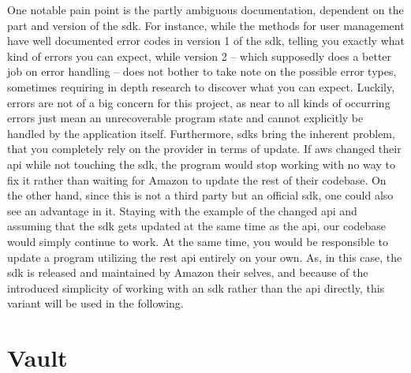 One notable pain point is the partly ambiguous documentation, dependent on the part and version of the \ac{sdk}.
For instance, while the methods for user management have well documented error codes in version 1 of the \ac{sdk}, telling you exactly what kind of errors you can expect, while version 2 -- which supposedly does a better job on error handling -- does not bother to take note on the possible error types, sometimes requiring in depth research to discover what you can expect.
Luckily, errors are not of a big concern for this project, as near to all kinds of occurring errors just mean an unrecoverable program state and cannot explicitly be handled by the application itself.
Furthermore, \acp{sdk} bring the inherent problem, that you completely rely on the provider in terms of update.
If \ac{aws} changed their \ac{api} while not touching the \ac{sdk}, the program would stop working with no way to fix it rather than waiting for Amazon to update the rest of their codebase.
On the other hand, since this is not a third party but an official \ac{sdk}, one could also see an advantage in it.
Staying with the example of the changed \ac{api} and assuming that the \ac{sdk} gets updated at the same time as the \ac{api}, our codebase would simply continue to work.
At the same time, you would be responsible to update a program utilizing the \acs{rest} \ac{api} entirely on your own.
As, in this case, the \ac{sdk} is released and maintained by Amazon their selves, and because of the introduced simplicity of working with an \ac{sdk} rather than the \ac{api} directly, this variant will be used in the following.

\section{Vault}